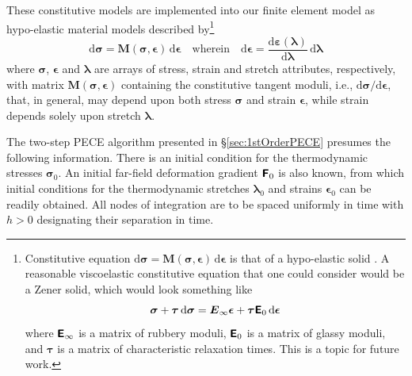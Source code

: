 These constitutive models are implemented into our finite element model as hypo-elastic material models \cite{Truesdell55} described by\footnote{
    Constitutive equation $\mathrm{d} \boldsymbol{\sigma} = \mathbf{M} ( \boldsymbol{\sigma}, \boldsymbol{\epsilon} ) \, \mathrm{d} \boldsymbol{\epsilon}$ is that of a hypo-elastic solid \cite{Truesdell55}.  A reasonable visco\-elastic constitutive equation that one could consider would be a Zener \cite{Zener48} solid, which would look something like
    $$ \boldsymbol{\sigma} + \boldsymbol{\tau} \, \mathrm{d} \boldsymbol{\sigma} = \boldsymbol{E}_{\infty} \boldsymbol{\epsilon} + \boldsymbol{\tau} \boldsymbol{\mathsf{E}}_0 \, \mathrm{d} \boldsymbol{\epsilon} $$ 
    where $\boldsymbol{\mathsf{E}}_{\infty}$ is a matrix of rubbery moduli, $\boldsymbol{\mathsf{E}}_0$ is a matrix of glassy moduli, and $\boldsymbol{\tau}$ is a matrix of characteristic relaxation times.  This is a topic for future work.
}
\begin{equation}
\mathrm{d} \boldsymbol{\sigma} = \mathbf{M} ( \boldsymbol{\sigma}, \boldsymbol{\epsilon} ) \, \mathrm{d} \boldsymbol{\epsilon} 
\quad \text{wherein} \quad
\mathrm{d} \boldsymbol{\epsilon} = 
\frac{\mathrm{d} \boldsymbol{\varepsilon} ( \boldsymbol{\lambda} )}
{\mathrm{d} \boldsymbol{\lambda}} \, \mathrm{d} \boldsymbol{\lambda}
\label{hypoelastic}
\end{equation}
where $\boldsymbol{\sigma}$, $\boldsymbol{\epsilon}$ and $\boldsymbol{\lambda}$ are arrays of stress, strain and stretch attributes, respectively, with matrix $\mathbf{M} ( \boldsymbol{\sigma}, \boldsymbol{\epsilon} )$ containing the constitutive tangent moduli, i.e., $\mathrm{d} \boldsymbol{\sigma} / \mathrm{d} \boldsymbol{\epsilon}$, that, in general, may depend upon both stress $\boldsymbol{\sigma}$ and strain $\boldsymbol{\epsilon}$, while strain depends solely upon stretch $\boldsymbol{\lambda}$.

The two-step PECE algorithm presented in \S\ref{sec:1stOrderPECE} presumes the following information.  There is an initial condition for the thermo\-dynamic stresses $\boldsymbol{\sigma}_0$.  An initial far-field deformation gradient $\boldsymbol{\mathsf{F}}_0$ is also known, from which initial conditions for the thermo\-dynamic stretches $\boldsymbol{\lambda}_0$ and strains $\boldsymbol{\epsilon}_0$ can be readily obtained.  All nodes of integration are to be spaced uniformly in time with $h>0$ designating their separation in time.  

